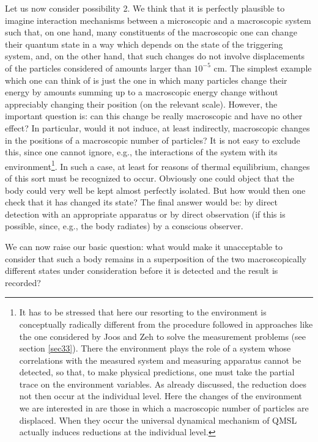 \documentclass[12pt]{article}
\begin{document}
Let us now consider possibility 2. We think that it is perfectly
plausible to imagine interaction mechanisms between a microscopic
and a macroscopic system such that, on one hand, many constituents
of the macroscopic one can change their quantum state in a way
which depends on the state of the triggering system, and, on the
other hand, that such changes do not involve displacements of the
particles considered of amounts larger than $10^{-5}$ cm. The
simplest example which one can think of is just the one in which
many particles change their energy by amounts summing up to a
macroscopic energy change without appreciably changing their
position (on the relevant scale). However, the important question
is: can this change be really macroscopic and have no other
effect? In particular, would it not induce, at least indirectly,
macroscopic changes in the positions of a macroscopic number of
particles? It is not easy to exclude this, since one cannot
ignore, e.g., the interactions of the system with its
environment\footnote{It has to be stressed that here our resorting
to the environment is conceptually radically different from the
procedure followed in approaches like the one considered by Joos
and Zeh \cite{jz} to solve the measurement problems (see section
\ref{sec33}). There the environment plays the role of a system
whose correlations with the measured system and measuring
apparatus cannot be detected, so that, to make physical
predictions, one must take the partial trace on the environment
variables. As already discussed, the reduction does not then occur
at the individual level. Here the changes of the environment we
are interested in are those in which a macroscopic number of
particles are displaced. When they occur the universal dynamical
mechanism of QMSL actually induces reductions at the individual
level.}. In such a case, at least for reasons of thermal
equilibrium, changes of this sort must be recognized to occur.
Obviously one could object that the body could very well be kept
almost perfectly isolated. But how would then one check that it
has changed its state? The final answer would be: by direct
detection with an appropriate apparatus or by direct observation
(if this is possible, since, e.g., the body radiates) by a
conscious observer.

We can now raise our basic question: what would make it
unacceptable to consider that such a body remains in a
superposition of the two macroscopically different states under
consideration before it is detected and the result is recorded?
\end{document}
